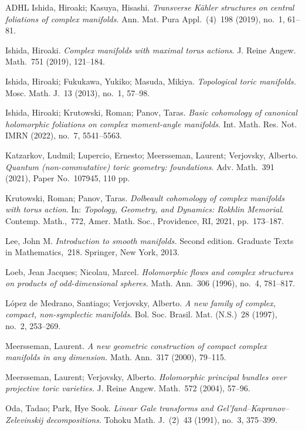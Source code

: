 \documentclass[a4paper]{amsart}
\theoremstyle{definition}
\theoremstyle{remark}
\numberwithin{equation}{section}
\newcommand{\<}{\langle}
\renewcommand{\>}{\rangle}
\begin{document}
\begin{thebibliography}{ADHL}
Ishida, Hiroaki; Kasuya, Hisashi.
\emph{Transverse K\"ahler structures on central foliations of complex manifolds.} Ann. Mat. Pura Appl.~(4)~198 (2019), no.~1, 61--81.

Ishida, Hiroaki. \emph{Complex manifolds with maximal torus actions}. 
J. Reine Angew. Math.~751 (2019), 121--184.

Ishida, Hiroaki; Fukukawa, Yukiko; Masuda, Mikiya. \emph{Topological toric manifolds.} Mosc. Math. J.~13 (2013), no.~1, 57--98.

Ishida, Hiroaki; Krutowski, Roman; Panov, Taras.
\emph{Basic cohomology of canonical holomorphic foliations on complex moment-angle manifolds}. Int. Math. Res. Not. IMRN (2022), no.~7, 5541--5563.

Katzarkov, Ludmil; Lupercio, Ernesto; Meersseman, Laurent; Verjovsky, Alberto.
\emph{Quantum (non-commutative) toric geometry: foundations}.
Adv. Math.~391 (2021), Paper No.~107945, 110 pp.

Krutowski, Roman; Panov, Taras. \emph{Dolbeault cohomology of complex manifolds with torus action}. In: \emph{Topology, Geometry, and Dynamics: Rokhlin Memorial}. Contemp. Math.,~772, Amer. Math. Soc., Providence, RI, 2021, pp.~173--187.

Lee, John M. \emph{Introduction to smooth manifolds.} Second edition. Graduate Texts in Mathematics,~218. Springer, New York, 2013.

Loeb, Jean Jacques; Nicolau, Marcel.
\emph{Holomorphic flows and complex structures on products of odd-dimensional spheres.}
Math. Ann.~306 (1996), no.~4, 781--817.

L\'opez de Medrano, Santiago; Verjovsky, Alberto.
\emph{A new family of complex, compact, non-symplectic manifolds}.
Bol. Soc. Brasil. Mat. (N.S.)~28 (1997), no.~2, 253--269.

Meersseman, Laurent. \emph{A new geometric construction of
compact complex manifolds in any dimension.} Math.
Ann.~317 (2000), 79--115.

Meersseman, Laurent; Verjovsky, Alberto. \emph{Holomorphic principal
bundles over projective toric varieties.} J. Reine Angew.
Math.~572 (2004), 57--96.

Oda, Tadao; Park, Hye Sook.
\emph{Linear Gale transforms and Gel'fand--Kapranov--Zelevinskij decompositions}.
Tohoku Math. J.~(2)~43 (1991), no.~3, 375--399.


\end{thebibliography}
\end{document}
